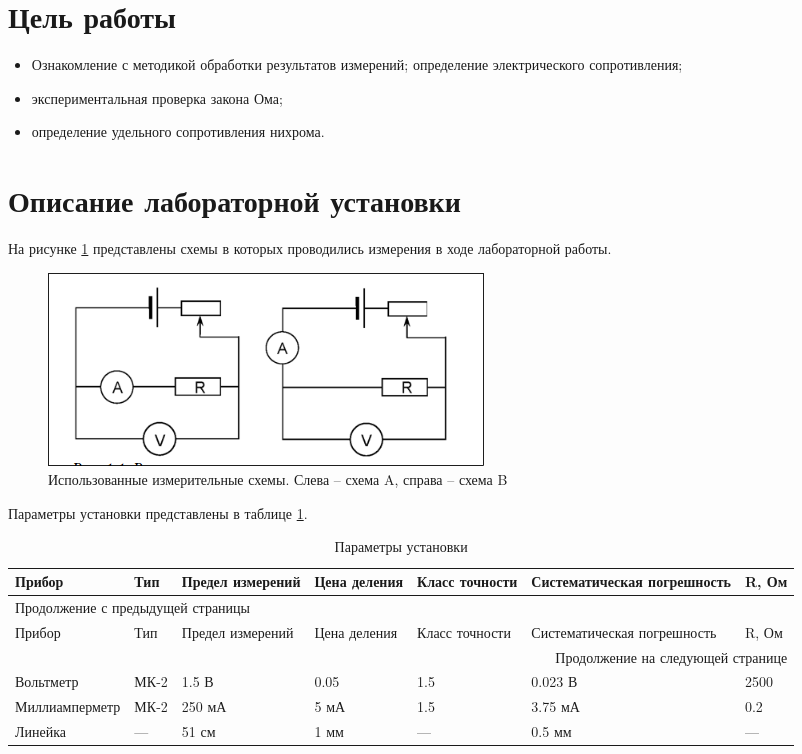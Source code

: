 \documentclass[14pt]{extarticle}
\begin{document}
\tableofcontents \clearpage
\section{Цель работы}
\label{sec:orgd604c2c}

\begin{itemize}
\item Ознакомление с методикой обработки результатов измерений;
определение электрического сопротивления;
\item экспериментальная проверка закона Ома;
\item определение удельного сопротивления нихрома.
\end{itemize}
\section{Описание лабораторной установки}
\label{sec:orgfbf1070}

На рисунке \ref{fig:org63ed464} представлены схемы в которых проводились измерения в ходе
лабораторной работы.

\begin{figure}[H]
\centering
\includegraphics[width=.9\linewidth]{./images/twoSchemes.png}
\caption{\label{fig:org63ed464}Использованные измерительные схемы. Слева – схема A, справа – схема B}
\end{figure}

Параметры установки представлены в таблице \ref{tab:org8b27c20}.

\begin{longtable}{|p{3.9cm}|l|p{2cm}|p{1.3cm}|p{1.2cm}|p{3.6cm}|p{1.2cm}|}
\caption{\label{tab:org8b27c20}Параметры установки}
\\
\hline
Прибор & Тип & Предел измерений & Цена деления & Класс точности & Систематическая погрешность & R, Ом\\
\hline
\endfirsthead
\multicolumn{7}{l}{Продолжение с предыдущей страницы} \\
\hline

Прибор & Тип & Предел измерений & Цена деления & Класс точности & Систематическая погрешность & R, Ом \\

\hline
\endhead
\hline\multicolumn{7}{r}{Продолжение на следующей странице} \\
\endfoot
\endlastfoot
\hline
Вольтметр & МК-2 & 1.5 В & 0.05 & 1.5 & 0.023 В & 2500\\
\hline
Миллиамперметр & МК-2 & 250 мА & 5 мА & 1.5 & 3.75 мА & 0.2\\
\hline
Линейка & --- & 51 см & 1 мм & --- & 0.5 мм & ---\\
\hline
\end{longtable}
\end{document}
